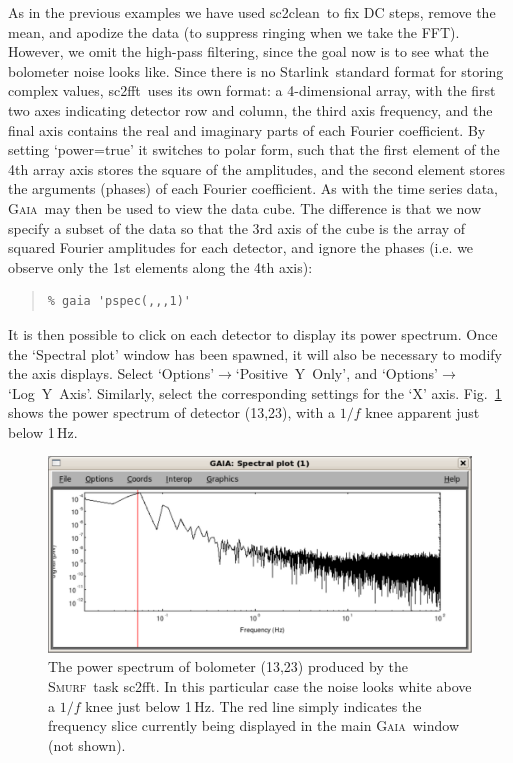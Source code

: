 \documentclass[twoside,11pt]{article}
\newcommand{\htmladdnormallink}[2]{#1}
\newcommand{\xref}[3]{#1}
\renewcommand{\_}{\texttt{\symbol{95}}}
\newenvironment{myquote}{\begin{quote}\begin{small}}{\end{small}\end{quote}}
\newcommand{\starlink}{\htmladdnormallink{Starlink}{http://starlink.jach.hawaii.edu}}
\newcommand{\gaia}{\xref{\textsc{Gaia}}{sun214}{}}
\newcommand{\smurf}{\xref{\textsc{Smurf}}{sun258}{}}
\newcommand{\task}[1]{\textsf{#1}}
\newcommand{\fft}{\xref{\task{sc2fft}}{sun258}{SC2FFT}}
\newcommand{\clean}{\xref{\task{sc2clean}}{sun258}{SC2CLEAN}}
\begin{document}
As in the previous examples we have used \clean\ to fix DC steps,
remove the mean, and apodize the data (to suppress ringing when we
take the FFT). However, we omit the high-pass filtering, since the
goal now is to see what the bolometer noise looks like. Since there is
no \starlink\ standard format for storing complex values, \fft\ uses
its own format: a 4-dimensional array, with the first two axes
indicating detector row and column, the third axis frequency, and the
final axis contains the real and imaginary parts of each Fourier
coefficient. By setting `power=true' it switches to polar form, such
that the first element of the 4th array axis stores the square of the
amplitudes, and the second element stores the arguments (phases) of
each Fourier coefficient. As with the time series data, \gaia\ may
then be used to view the data cube. The difference is that we now
specify a subset of the data so that the 3rd axis of the cube is the
array of squared Fourier amplitudes for each detector, and ignore the
phases (i.e. we observe only the 1st elements along the 4th axis):

\begin{myquote}
\begin{verbatim}
% gaia 'pspec(,,,1)'
\end{verbatim}
\end{myquote}

It is then possible to click on each detector to display its power
spectrum. Once the `Spectral plot' window has been spawned, it will
also be necessary to modify the axis displays. Select
`Options'$\rightarrow$`Positive~Y~Only', and
`Options'$\rightarrow$`Log~Y~Axis'. Similarly, select the
corresponding settings for the `X' axis. Fig.~\ref{fig:pspec} shows
the power spectrum of detector (13,23), with a $1/f$ knee apparent
just below 1\,Hz.

\begin{figure}
\begin{center}
\includegraphics[width=\linewidth]{sc19_pspec}
\caption{The power spectrum of bolometer (13,23) produced by the
  \smurf\ task \fft. In this particular case the noise looks white
  above a $1/f$ knee just below 1\,Hz. The red line simply indicates
  the frequency slice currently being displayed in the main \gaia\
  window (not shown).}
\label{fig:pspec}
\end{center}
\end{figure}
\end{document}
